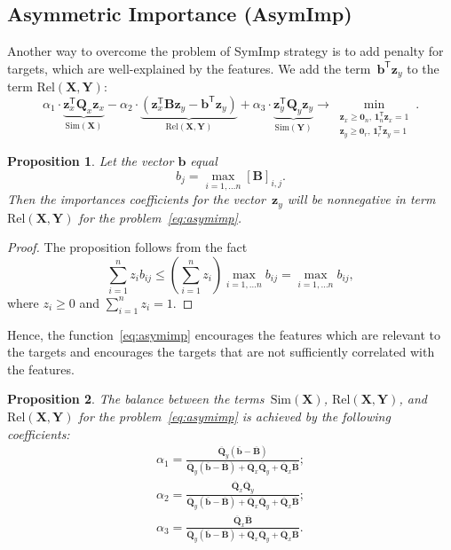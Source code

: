 \documentclass[12pt,oneside]{article}
\newtheorem{proposition}{Proposition}
\theoremstyle{definition}
\newcommand{\bz}{\mathbf{z}}
\newcommand{\bb}{\mathbf{b}}
\newcommand{\bY}{\mathbf{Y}}
\newcommand{\bX}{\mathbf{X}}
\newcommand{\bB}{\mathbf{B}}
\newcommand{\bQ}{\mathbf{Q}}
\newcommand{\T}{\mathsf{T}}
\newcommand{\bOne}{\boldsymbol{1}}
\newcommand{\bZero}{\boldsymbol{0}}
\begin{document}
\subsection{Asymmetric Importance (AsymImp)}
Another way to overcome the problem of SymImp strategy is to add penalty for targets, which are well-explained by the features.
We add the term~$\bb^{\T} \bz_y$ to the term $\text{Rel}(\bX, \bY)$:
\begin{equation}
\alpha_1 \cdot \underbrace{\bz_x^{\T} \bQ_x \bz_x}_{\text{Sim}(\bX)} - \alpha_2 \cdot  \underbrace{\left(\bz_x^{\T} \bB \bz_y - \bb^{\T} \bz_y \right) }_{\text{Rel}(\bX, \bY)} + \alpha_3 \cdot \underbrace{\bz_y^{\T} \bQ_y \bz_y}_{\text{Sim}(\bY)} \rightarrow \min_{\substack{\bz_x \geq \bZero_n, \, \bOne_n^{\T}\bz_x=1 \\ \bz_y \geq \bZero_r, \, \bOne_r^{\T}\bz_y=1}}.
\label{eq:asymimp}
\end{equation}
\begin{proposition}
	Let the vector $\bb$ equal
	\begin{equation}
	b_j = \max_{i=1, \dots n} [\bB]_{i, j}.
	\end{equation}
	Then the importances coefficients for the vector~$\bz_y$ will be nonnegative in term~$\text{Rel}(\bX, \bY)$ for the problem~\eqref{eq:asymimp}.
\end{proposition}
\begin{proof}
	The proposition follows from the fact 
	\[
		\sum_{i=1}^n  z_i b_{ij} \leq \left(\sum_{i=1}^n z_i \right)\max_{i=1, \dots n} b_{ij} = \max_{i=1, \dots n} b_{ij},
	\]
	where $z_i \geq 0$ and $\sum_{i=1}^nz_i = 1$.
\end{proof}
Hence, the function~\eqref{eq:asymimp} encourages the features which are relevant to the targets and encourages the targets that are not sufficiently correlated with the features. 
\begin{proposition}
	The balance between the terms~$\text{Sim}(\bX)$, $\text{Rel}(\bX, \bY)$, and $\text{Rel}(\bX, \bY)$ for the problem~\eqref{eq:asymimp} is achieved by the following coefficients:
	\begin{align}
	\alpha_1 = \frac{\overline{\bQ}_y \left( \overline{\bb} - \overline{\bB}\right)}{\overline{\bQ}_y \left( \overline{\bb} - \overline{\bB}\right) + \overline{\bQ}_x \overline{\bQ}_y + \overline{\bQ}_x \overline{\bB}}; \\
	\alpha_2 = \frac{\overline{\bQ}_x \overline{\bQ}_y}{\overline{\bQ}_y \left( \overline{\bb} - \overline{\bB}\right) + \overline{\bQ}_x \overline{\bQ}_y + \overline{\bQ}_x \overline{\bB}}; \\
	\alpha_3  = \frac{\overline{\bQ}_x \overline{\bB}}{\overline{\bQ}_y \left( \overline{\bb} - \overline{\bB}\right) + \overline{\bQ}_x \overline{\bQ}_y + \overline{\bQ}_x \overline{\bB}}.
	\end{align}
\end{proposition}
\end{document}
